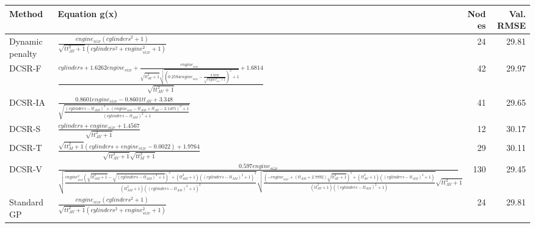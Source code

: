 \begin{tabular}{lp{9cm}rr}
\toprule
Method & Equation g(x) & Nodes & Val. RMSE \\
\midrule
Dynamic penalty & $\frac{engine_{size} \left(cylinders^{2} + 1\right)}{\sqrt{tt_{AV}^{2} + 1} \left(cylinders^{2} + engine_{size}^{2} + 1\right)}$ & 24 & 29.81 \\
DCSR-F & $\frac{cylinders + 1.6262 engine_{size} + \frac{engine_{size}}{\sqrt{tt_{AV}^{2} + 1} \sqrt{\left(0.2594 engine_{size} - \frac{0.9292}{\sqrt{engine_{size}^{2} + 1}}\right)^{2} + 1}} + 1.6814}{\sqrt{tt_{AV}^{2} + 1}}$ & 42 & 29.97 \\
DCSR-IA & $\frac{0.8601 engine_{size} - 0.8601 tt_{AV} + 3.348}{\sqrt{\frac{\left(cylinders - tt_{AM}\right)^{2} + \left(engine_{size} - tt_{AM} + tt_{AV} - 2.1475\right)^{2} + 1}{\left(cylinders - tt_{AM}\right)^{2} + 1}}}$ & 41 & 29.65 \\
DCSR-S & $\frac{cylinders + engine_{size} + 1.4567}{\sqrt{tt_{AV}^{2} + 1}}$ & 12 & 30.17 \\
DCSR-T & $\frac{\sqrt{tt_{M}^{2} + 1} \left(cylinders + engine_{size} - 0.0022\right) + 1.9764}{\sqrt{tt_{AV}^{2} + 1} \sqrt{tt_{M}^{2} + 1}}$ & 29 & 30.11 \\
DCSR-V & $\frac{0.597 engine_{size}}{\sqrt{\frac{engine_{size}^{2} \left(\sqrt{tt_{AM}^{2} + 1} - \sqrt{\left(cylinders - tt_{AM}\right)^{2} + 1}\right)^{2} + \left(tt_{AM}^{2} + 1\right) \left(\left(cylinders - tt_{AM}\right)^{2} + 1\right)^{2}}{\left(tt_{AM}^{2} + 1\right) \left(\left(cylinders - tt_{AM}\right)^{2} + 1\right)^{2}}} \sqrt{\frac{\left(- engine_{size} + \left(tt_{AM} + 2.7892\right) \sqrt{tt_{AV}^{2} + 1}\right)^{2} + \left(tt_{AV}^{2} + 1\right) \left(\left(cylinders - tt_{AM}\right)^{2} + 1\right)}{\left(tt_{AV}^{2} + 1\right) \left(\left(cylinders - tt_{AM}\right)^{2} + 1\right)}} \sqrt{tt_{AV}^{2} + 1}}$ & 130 & 29.45 \\
Standard GP & $\frac{engine_{size} \left(cylinders^{2} + 1\right)}{\sqrt{tt_{AV}^{2} + 1} \left(cylinders^{2} + engine_{size}^{2} + 1\right)}$ & 24 & 29.81 \\
\bottomrule
\end{tabular}
